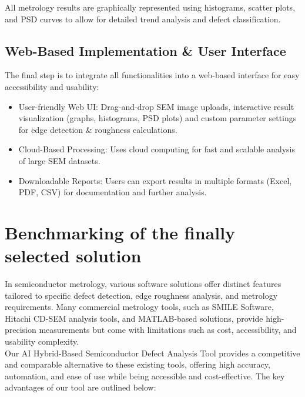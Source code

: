 \documentclass[12pt,oneside,letterpaper,english]{article}
\begin{document}
All metrology results are graphically represented using histograms, scatter plots, and PSD curves to allow for detailed trend analysis and defect classification.

\subsection{Web-Based Implementation \& User Interface}
The final step is to integrate all functionalities into a web-based interface for easy accessibility and usability:\\

\begin{itemize}
	\item User-friendly Web UI: Drag-and-drop SEM image uploads, interactive result visualization (graphs, histograms, PSD plots) and custom parameter settings for edge detection \& roughness calculations.
	\item Cloud-Based Processing: Uses cloud computing for fast and scalable analysis of large SEM datasets.
	\item Downloadable Reports: Users can export results in multiple formats (Excel, PDF, CSV) for documentation and further analysis.
\end{itemize}

\section{Benchmarking of the finally selected solution}
In semiconductor metrology, various software solutions offer distinct features tailored to specific defect detection, edge roughness analysis, and metrology requirements. Many commercial metrology tools, such as SMILE Software, Hitachi CD-SEM analysis tools, and MATLAB-based solutions, provide high-precision measurements but come with limitations such as cost, accessibility, and usability complexity.\\

Our AI Hybrid-Based Semiconductor Defect Analysis Tool provides a competitive and comparable alternative to these existing tools, offering high accuracy, automation, and ease of use while being accessible and cost-effective. The key advantages of our tool are outlined below:
\end{document}
